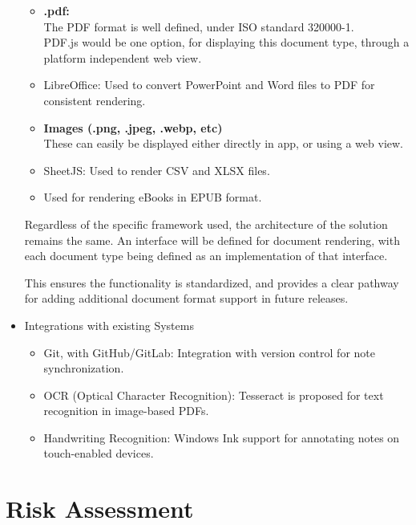 \begin{itemize}
\begin{itemize}
            \item \textbf{.pdf:} \\
            The PDF format is well defined, under ISO standard 320000-1. \\
            PDF.js would be one option, for displaying this document type, through a platform independent web view. 
            
            \item LibreOffice: Used to convert PowerPoint and Word files to PDF for consistent rendering.
            
            \item \textbf{Images (.png, .jpeg, .webp, etc)}\\
            These can easily be displayed either directly in app, or using a web view. 
            
            \item SheetJS: Used to render CSV and XLSX files.
            
            \item Used for rendering eBooks in EPUB format.
            
        \end{itemize}

        Regardless of the specific framework used, the architecture of the solution remains the same. An interface will be defined for document rendering, with each document type being defined as an implementation of that interface. 
    
        This ensures the functionality is standardized, and provides a clear pathway for adding additional document format support in future releases. 

    \item Integrations with existing Systems
    \begin{itemize}
        \item Git, with GitHub/GitLab: Integration with version control for note synchronization.
        \item OCR (Optical Character Recognition): Tesseract is proposed for text recognition in image-based PDFs.
        \item Handwriting Recognition: Windows Ink support for annotating notes on touch-enabled devices.
    \end{itemize}
\end{itemize}


\section{Risk Assessment}

